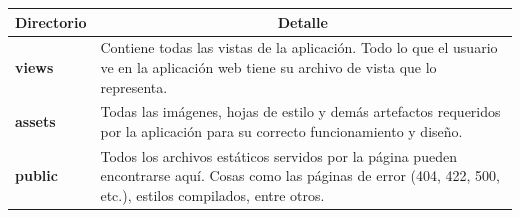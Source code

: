 \begin{center}
  \begin{tabular}{ | l | p{12.5cm} |}
    \hline
    \multicolumn{1}{|c|}{\textbf{Directorio}} & \multicolumn{1}{|c|}{\textbf{Detalle}} \\
    \hline
    
    {\textbf{views}} & Contiene todas las vistas de la aplicación. Todo lo que el usuario ve en la aplicación web tiene su archivo de vista que lo representa. \\ \hline
    
    {\textbf{assets}} & Todas las imágenes, hojas de estilo y demás artefactos requeridos por la aplicación para su correcto funcionamiento y diseño. \\ \hline
    
    {\textbf{public}} & Todos los archivos estáticos servidos por la página pueden encontrarse aquí. Cosas como las páginas de error (404, 422, 500, etc.), estilos compilados, entre otros.\\ \hline
  \end{tabular}
\end{center}




